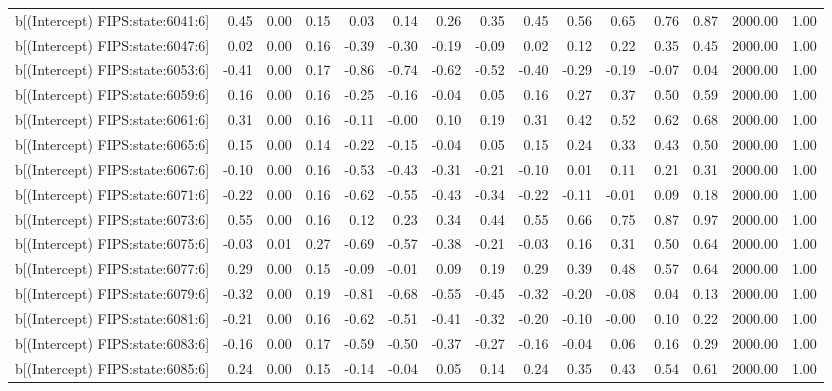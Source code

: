 \begin{table}[ht]
\begin{tabular}{rrrrrrrrrrrrrrr}
  b[(Intercept) FIPS:state:6041:6] & 0.45 & 0.00 & 0.15 & 0.03 & 0.14 & 0.26 & 0.35 & 0.45 & 0.56 & 0.65 & 0.76 & 0.87 & 2000.00 & 1.00 \\ 
  b[(Intercept) FIPS:state:6047:6] & 0.02 & 0.00 & 0.16 & -0.39 & -0.30 & -0.19 & -0.09 & 0.02 & 0.12 & 0.22 & 0.35 & 0.45 & 2000.00 & 1.00 \\ 
  b[(Intercept) FIPS:state:6053:6] & -0.41 & 0.00 & 0.17 & -0.86 & -0.74 & -0.62 & -0.52 & -0.40 & -0.29 & -0.19 & -0.07 & 0.04 & 2000.00 & 1.00 \\ 
  b[(Intercept) FIPS:state:6059:6] & 0.16 & 0.00 & 0.16 & -0.25 & -0.16 & -0.04 & 0.05 & 0.16 & 0.27 & 0.37 & 0.50 & 0.59 & 2000.00 & 1.00 \\ 
  b[(Intercept) FIPS:state:6061:6] & 0.31 & 0.00 & 0.16 & -0.11 & -0.00 & 0.10 & 0.19 & 0.31 & 0.42 & 0.52 & 0.62 & 0.68 & 2000.00 & 1.00 \\ 
  b[(Intercept) FIPS:state:6065:6] & 0.15 & 0.00 & 0.14 & -0.22 & -0.15 & -0.04 & 0.05 & 0.15 & 0.24 & 0.33 & 0.43 & 0.50 & 2000.00 & 1.00 \\ 
  b[(Intercept) FIPS:state:6067:6] & -0.10 & 0.00 & 0.16 & -0.53 & -0.43 & -0.31 & -0.21 & -0.10 & 0.01 & 0.11 & 0.21 & 0.31 & 2000.00 & 1.00 \\ 
  b[(Intercept) FIPS:state:6071:6] & -0.22 & 0.00 & 0.16 & -0.62 & -0.55 & -0.43 & -0.34 & -0.22 & -0.11 & -0.01 & 0.09 & 0.18 & 2000.00 & 1.00 \\ 
  b[(Intercept) FIPS:state:6073:6] & 0.55 & 0.00 & 0.16 & 0.12 & 0.23 & 0.34 & 0.44 & 0.55 & 0.66 & 0.75 & 0.87 & 0.97 & 2000.00 & 1.00 \\ 
  b[(Intercept) FIPS:state:6075:6] & -0.03 & 0.01 & 0.27 & -0.69 & -0.57 & -0.38 & -0.21 & -0.03 & 0.16 & 0.31 & 0.50 & 0.64 & 2000.00 & 1.00 \\ 
  b[(Intercept) FIPS:state:6077:6] & 0.29 & 0.00 & 0.15 & -0.09 & -0.01 & 0.09 & 0.19 & 0.29 & 0.39 & 0.48 & 0.57 & 0.64 & 2000.00 & 1.00 \\ 
  b[(Intercept) FIPS:state:6079:6] & -0.32 & 0.00 & 0.19 & -0.81 & -0.68 & -0.55 & -0.45 & -0.32 & -0.20 & -0.08 & 0.04 & 0.13 & 2000.00 & 1.00 \\ 
  b[(Intercept) FIPS:state:6081:6] & -0.21 & 0.00 & 0.16 & -0.62 & -0.51 & -0.41 & -0.32 & -0.20 & -0.10 & -0.00 & 0.10 & 0.22 & 2000.00 & 1.00 \\ 
  b[(Intercept) FIPS:state:6083:6] & -0.16 & 0.00 & 0.17 & -0.59 & -0.50 & -0.37 & -0.27 & -0.16 & -0.04 & 0.06 & 0.16 & 0.29 & 2000.00 & 1.00 \\ 
  b[(Intercept) FIPS:state:6085:6] & 0.24 & 0.00 & 0.15 & -0.14 & -0.04 & 0.05 & 0.14 & 0.24 & 0.35 & 0.43 & 0.54 & 0.61 & 2000.00 & 1.00 \\ 

\end{tabular}
\end{table}
